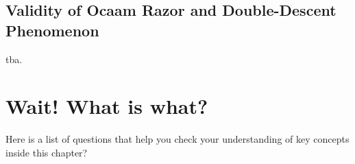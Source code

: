 \subsection{Validity of Ocaam Razor and Double-Descent Phenomenon}
\begin{boxedexample} \complementary{\theexample}
    \label{ex:double_descent}
    tba.
\end{boxedexample}

\section*{Wait! What is what?}
Here is a list of questions that help you check your understanding of key
concepts inside this chapter?


